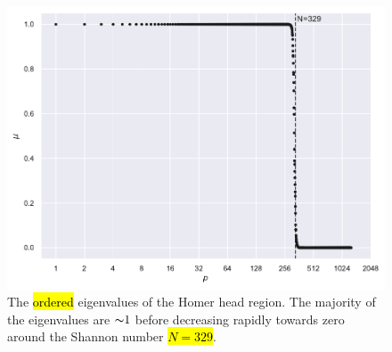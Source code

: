 \begin{figure}[htpb]
	\centering\capstart{}
	\includegraphics[width=\textwidth]{homer_slepian_eigenvalues_b1275.pdf}
	\caption[
		The Slepian eigenvalues of the Homer head region
	]{
		The \hl{ordered} eigenvalues of the Homer head region.
		The majority of the eigenvalues are \({\thicksim}\num{1}\) before decreasing rapidly towards zero around the Shannon number \hl{\mbox{\(N=329\)}}.
	}\label{fig:chapter5_slepian_eigenvalues}
\end{figure}
